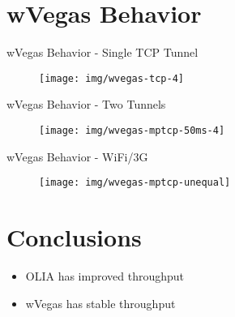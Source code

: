 \documentclass{beamer}
\begin{document}
\section{wVegas Behavior}
\begin{frame}{wVegas Behavior - Single TCP Tunnel}
  \begin{figure}
    \texttt{[image: img/wvegas-tcp-4]}
  \end{figure}
\end{frame}
\begin{frame}{wVegas Behavior - Two Tunnels}
  \begin{figure}
    \texttt{[image: img/wvegas-mptcp-50ms-4]}
  \end{figure}
\end{frame}
\begin{frame}{wVegas Behavior - WiFi/3G}
  \begin{figure}
    \texttt{[image: img/wvegas-mptcp-unequal]}
  \end{figure}
\end{frame}

\section{Conclusions}
\begin{frame}
  \begin{itemize}
    \item OLIA has improved throughput
    \item wVegas has stable throughput
  \end{itemize}
\end{frame}
\end{document}
